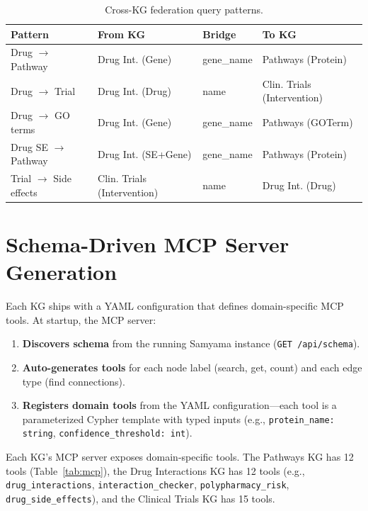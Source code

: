\documentclass[11pt]{article}
\begin{document}
\begin{table}[H]
\centering
\caption{Cross-KG federation query patterns.}
\label{tab:patterns}
\small
\begin{tabular}{p{3.5cm}p{3.5cm}p{2cm}p{2.5cm}}
\toprule
\textbf{Pattern} & \textbf{From KG} & \textbf{Bridge} & \textbf{To KG} \\
\midrule
Drug $\rightarrow$ Pathway & Drug Int. (Gene) & gene\_name & Pathways (Protein) \\
Drug $\rightarrow$ Trial & Drug Int. (Drug) & name & Clin. Trials (Intervention) \\
Drug $\rightarrow$ GO terms & Drug Int. (Gene) & gene\_name & Pathways (GOTerm) \\
Drug SE $\rightarrow$ Pathway & Drug Int. (SE+Gene) & gene\_name & Pathways (Protein) \\
Trial $\rightarrow$ Side effects & Clin. Trials (Intervention) & name & Drug Int. (Drug) \\
\bottomrule
\end{tabular}
\end{table}

\section{Schema-Driven MCP Server Generation}

Each KG ships with a YAML configuration that defines domain-specific MCP tools. At startup, the MCP server:

\begin{enumerate}[leftmargin=*]
  \item \textbf{Discovers schema} from the running Samyama instance (\texttt{GET /api/schema}).
  \item \textbf{Auto-generates tools} for each node label (search, get, count) and each edge type (find connections).
  \item \textbf{Registers domain tools} from the YAML configuration---each tool is a parameterized Cypher template with typed inputs (e.g., \texttt{protein\_name: string}, \texttt{confidence\_threshold: int}).
\end{enumerate}

Each KG's MCP server exposes domain-specific tools. The Pathways KG has 12 tools (Table~\ref{tab:mcp}), the Drug Interactions KG has 12 tools (e.g., \texttt{drug\_interactions}, \texttt{interaction\_checker}, \texttt{polypharmacy\_risk}, \texttt{drug\_side\_effects}), and the Clinical Trials KG has 15 tools.
\end{document}
